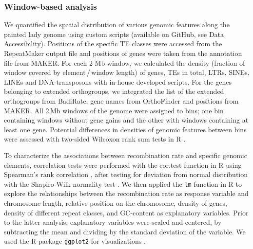 \documentclass[twocolumn]{bmcart}%
\begin{document}
\subsubsection*{Window-based analysis}
We quantified the spatial distribution of various genomic features along the painted lady genome using custom scripts (available on GitHub, see Data Accessibility). Positions of the specific TE classes were accessed from the RepeatMaker output file and positions of genes were taken from the annotation file from MAKER. For each 2 Mb window, we calculated the density (fraction of window covered by element\,/\,window length) of genes, TEs in total, LTRs, SINEs, LINEs and DNA-transposons with in-house developed scripts. For the genes belonging to extended orthogroups, we integrated the list of the extended orthogroups from BadiRate, gene names from OrthoFinder and positions from MAKER. All 2\,Mb windows of the genome were assigned to bins; one bin containing windows without gene gains and the other with windows containing at least one gene. Potential differences in densities of genomic features between bins were assessed with two-sided Wilcoxon rank sum tests in R \cite{bauerConstructingConfidenceSets1972}.

To characterize the associations between recombination rate and specific genomic elements, correlation tests were performed with the cor.test function in R using Spearman’s rank correlation \cite{bestAlgorithm89Upper1975}, after testing for deviation from normal distribution with the Shapiro-Wilk normality test \cite{roystonExtensionShapiroWilk1982}. We then applied the \texttt{lm} function in R to explore the relationships between the recombination rate as response variable and chromosome length, relative position on the chromosome, density of genes, density of different repeat classes, and GC-content as explanatory variables. Prior to the latter analysis, explanatory variables were scaled and centered, by subtracting the mean and dividing by the standard deviation of the variable. We used the R-package \texttt{ggplot2} for visualizations \cite{wickhamGgplot2ElegantGraphics2009}.


\end{document}
